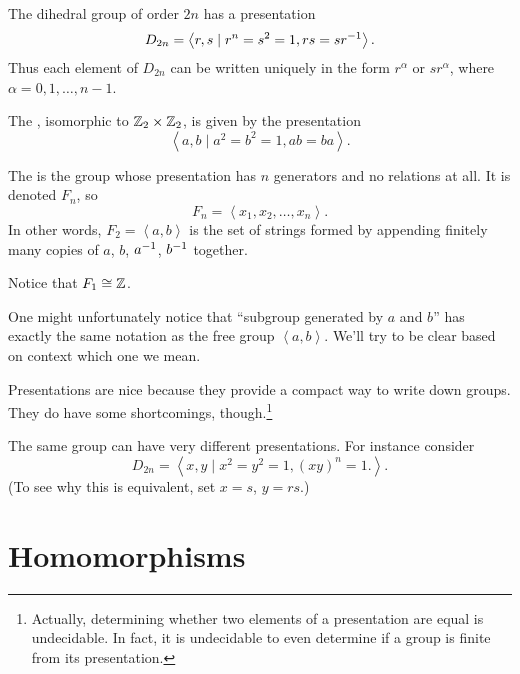 \begin{example}
	The dihedral group of order $2n$ has a presentation
	\[ D_{2n}
		= \left< r, s \mid r^n = s^2 = 1, rs = sr^{-1} \right>.
	\]
	Thus each element of $D_{2n}$ can be written uniquely in the form $r^\alpha$
	or $sr^\alpha$, where $\alpha = 0, 1, \dots, n-1$.
\end{example}

\begin{example}
	The , isomorphic to $\mathbb Z_{2} \times \mathbb Z_{2}$, is given by the presentation
	\[ \left< a,b \mid a^2=b^2=1, ab=ba \right>. \]
\end{example}

\begin{example}
	The  is the group
	whose presentation has $n$ generators and no relations at all.
	It is denoted $F_n$, so
	\[
		F_n = \left< x_1, x_2, \dots, x_n \right>.
	\]
	In other words, $F_2 = \left<a,b\right>$ is the set of strings
	formed by appending finitely many copies of $a$, $b$, $a^{-1}$, $b^{-1}$ together.
\end{example}
\begin{ques}
	Notice that $F_1 \cong \mathbb Z$.
\end{ques}
\begin{abuse}
	One might unfortunately notice that ``subgroup generated by $a$ and $b$''
	has exactly the same notation as the free group $\left<a,b\right>$.
	We'll try to be clear based on context which one we mean.
\end{abuse}

Presentations are nice because they provide a compact way to write down groups.
They do have some shortcomings, though.\footnote{%
Actually, determining whether two elements of a presentation are equal is undecidable.
In fact, it is undecidable to even determine if a group is finite from its presentation.}

\begin{example}
	The same group can have very different presentations.
	For instance consider
	\[ D_{2n} = \left< x,y \mid x^2=y^2=1, (xy)^n=1. \right>. \]
	(To see why this is equivalent, set $x=s$, $y=rs$.)
\end{example}


\section{Homomorphisms}

